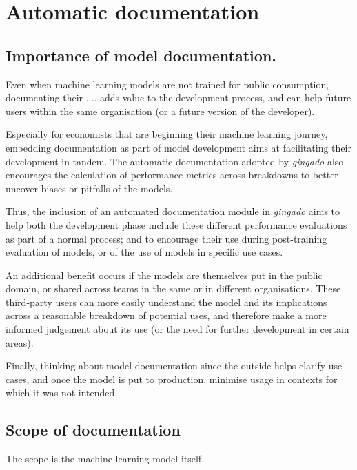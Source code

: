 \documentclass{article}
\begin{document}


\section{Automatic documentation}\label{documentation}
\subsection{Importance of model documentation.}

Even when machine learning models are not trained for public consumption, documenting their .... adds value to the development process, and can help future users within the same organisation (or a future version of the developer).

Especially for economists that are beginning their machine learning journey, embedding documentation as part of model development aims at facilitating their development in tandem. The automatic documentation adopted by \textit{gingado} also encourages the calculation of performance metrics across breakdowns to better uncover biases or pitfalls of the models.

Thus, the inclusion of an automated documentation module in \textit{gingado} aims to help both the development phase include these different performance evaluations as part of a normal process; and to encourage their use during post-training evaluation of models, or of the use of models in specific use cases.

An additional benefit occurs if the models are themselves put in the public domain, or shared across teams in the same or in different organisations. These third-party users can more easily understand the model and its implications across a reasonable breakdown of potential uses, and therefore make a more informed judgement about its use (or the need for further development in certain areas).

Finally, thinking about model documentation since the outside helps clarify use cases, and once the model is put to production, minimise usage in contexts for which it was not intended.


\subsection{Scope of documentation}

The scope is the machine learning model itself. 
\end{document}

